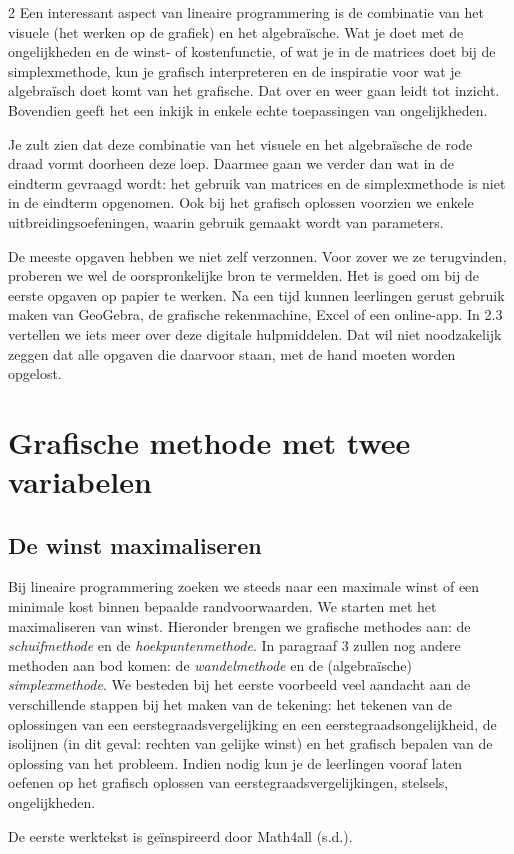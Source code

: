 \begin{multicols}{2}
    Een interessant aspect van lineaire programmering is de combinatie van het visuele (het werken op de grafiek) en het algebraïsche. Wat je doet met de ongelijkheden en de winst- of kostenfunctie, of wat je in de matrices doet bij de simplexmethode, kun je grafisch interpreteren en de inspiratie voor wat je algebraïsch doet komt van het grafische. Dat over en weer gaan leidt tot inzicht. Bovendien geeft het een inkijk in enkele echte toepassingen van ongelijkheden. 
    
    Je zult zien dat deze combinatie van het visuele en het algebraïsche de rode draad vormt doorheen deze loep. Daarmee gaan we verder dan wat in de eindterm gevraagd wordt: het gebruik van matrices en de simplexmethode is niet in de eindterm opgenomen. Ook bij het grafisch oplossen voorzien we enkele uitbreidingsoefeningen, waarin gebruik gemaakt wordt van parameters.

    De meeste opgaven hebben we niet zelf verzonnen. Voor zover we ze terugvinden, proberen we wel de oorspronkelijke bron te vermelden. Het is goed om bij de eerste opgaven op papier te werken. Na een tijd kunnen leerlingen gerust gebruik maken van GeoGebra, de grafische rekenmachine, Excel of een online-app. In 2.3 vertellen we iets meer over deze digitale hulpmiddelen. Dat wil niet noodzakelijk zeggen dat alle opgaven die daarvoor staan, met de hand moeten worden opgelost.


\section{ Grafische methode met twee variabelen}
	
\subsection{De winst maximaliseren}

    Bij lineaire programmering zoeken we steeds naar een maximale winst of een minimale kost binnen bepaalde randvoorwaarden. We starten met het maximaliseren van winst. Hieronder brengen we grafische methodes aan:  de \emph{schuifmethode} en de \emph{hoekpuntenmethode}. In paragraaf 3 zullen nog andere methoden aan bod komen: de \emph{wandelmethode} en de (algebraïsche) \emph{simplexmethode}. We besteden bij het eerste voorbeeld veel aandacht aan de verschillende stappen bij het maken van de tekening: het tekenen van de oplossingen van een eerstegraadsvergelijking en een eerstegraadsongelijkheid, de isolijnen (in dit geval: rechten van gelijke winst) en het grafisch bepalen van de oplossing van het probleem. Indien nodig kun je de leerlingen vooraf laten oefenen op het grafisch oplossen van eerstegraadsvergelijkingen, stelsels, ongelijkheden.

    De eerste werktekst is geïnspireerd door Math4all (s.d.).

\end{multicols}

